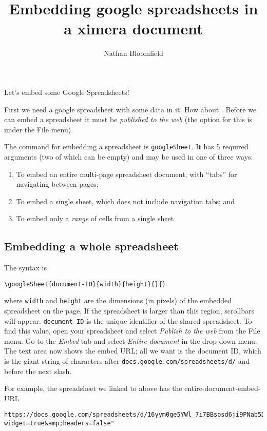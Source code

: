 \documentclass{ximera}
\title{Embedding google spreadsheets in a ximera document}
\author{Nathan Bloomfield}
\begin{document}
\maketitle

Let's embed some Google Spreadsheets!

First we need a google spreadsheet with some data in it. How about . Before we can embed a spreadsheet it must be \emph{published to the web} (the option for this is under the File menu).

The command for embedding a spreadsheet is \texttt{googleSheet}. It has 5 required arguments (two of which can be empty) and may be used in one of three ways:
\begin{enumerate}
\item To embed an entire multi-page spreadsheet document, with ``tabs'' for navigating between pages;
\item To embed a single sheet, which does not include navigation tabs; and
\item To embed only a \emph{range} of cells from a single sheet
\end{enumerate}

\subsection{Embedding a whole spreadsheet}

The syntax is
\begin{verbatim}
\googleSheet{document-ID}{width}{height}{}{}
\end{verbatim}
where \texttt{width} and \texttt{height} are the dimensions (in pixels) of the embedded spreadsheet on the page. If the spreadsheet is larger than this region, scrollbars will appear. \texttt{document-ID} is the unique identifier of the shared spreadsheet. To find this value, open your spreadsheet and select \emph{Publish to the web} from the File menu. Go to the \emph{Embed} tab and select \emph{Entire document} in the drop-down menu. The text area now shows the embed URL; all we want is the document ID, which is the giant string of characters after \texttt{docs.google.com/spreadsheets/d/} and before the next slash.

For example, the spreadsheet we linked to above has the entire-document-embed-URL

\begin{verbatim}
https://docs.google.com/spreadsheets/d/16yym0ge5YWl_7i7BBsosd6ji9PNab5DWKnQLVjxJRDo/pubhtml?widget=true&amp;headers=false"
\end{verbatim}
\end{document}
